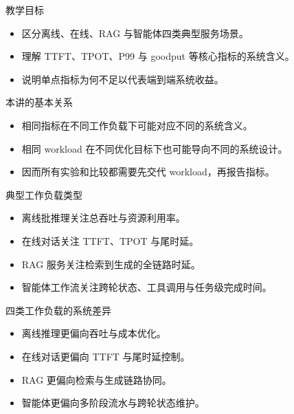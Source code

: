 




\begin{frame}[plain]
  \titlepage
\end{frame}

\begin{frame}{教学目标}
  \begin{itemize}
    \item 区分离线、在线、RAG 与智能体四类典型服务场景。
    \item 理解 TTFT、TPOT、P99 与 goodput 等核心指标的系统含义。
    \item 说明单点指标为何不足以代表端到端系统收益。
  \end{itemize}
\end{frame}

\begin{frame}{本讲的基本关系}
  \begin{itemize}
    \item 相同指标在不同工作负载下可能对应不同的系统含义。
    \item 相同 workload 在不同优化目标下也可能导向不同的系统设计。
    \item 因而所有实验和比较都需要先交代 workload，再报告指标。
  \end{itemize}
\end{frame}

\begin{frame}{典型工作负载类型}
  \begin{itemize}
    \item 离线批推理关注总吞吐与资源利用率。
    \item 在线对话关注 TTFT、TPOT 与尾时延。
    \item RAG 服务关注检索到生成的全链路时延。
    \item 智能体工作流关注跨轮状态、工具调用与任务级完成时间。
  \end{itemize}
\end{frame}

\begin{frame}{四类工作负载的系统差异}
  \begin{itemize}
    \item 离线推理更偏向吞吐与成本优化。
    \item 在线对话更偏向 TTFT 与尾时延控制。
    \item RAG 更偏向检索与生成链路协同。
    \item 智能体更偏向多阶段流水与跨轮状态维护。
  \end{itemize}
\end{frame}

